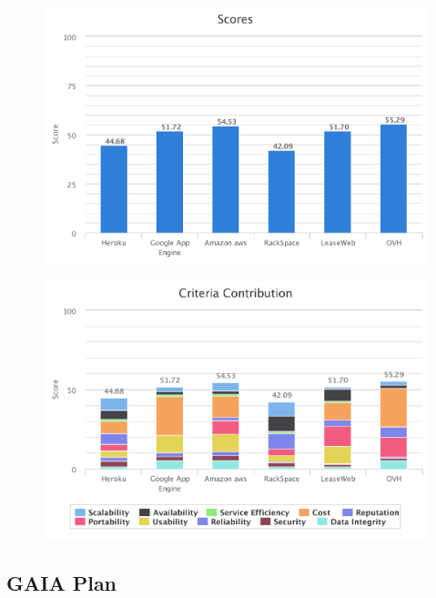 \documentclass[a4paper,11pt]{article}
\begin{document}
\begin{figure}[h]
  \includegraphics[width=\textwidth]{img/Result/ranking.pdf}
\end{figure}

\begin{figure}[h]
  \includegraphics[width=\textwidth]{img/Result/criteria_contribution.pdf}
\end{figure}

\subsection{GAIA Plan}
\end{document}
